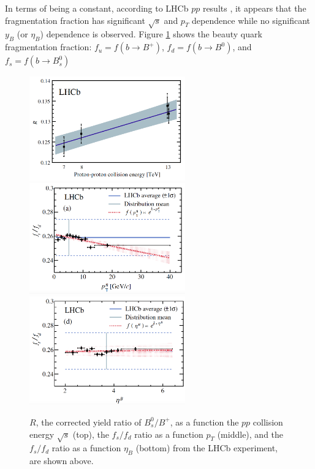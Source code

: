 In terms of being a constant, according to LHCb $pp$ results \cite{LHCbFF}, it appears that the fragmentation fraction has significant $\sqrt s$ and $p_T$ dependence while no significant $y_B$ (or $\eta_B$) dependence is observed. Figure \ref{BeautyFFLHCb} shows the beauty quark fragmentation fraction: $f_u = f(b \rightarrow B^+)$, $f_d = f(b \rightarrow B^0)$, and $f_s = f(b \rightarrow B_s^0)$

 \begin{figure}[hbtp]
\begin{center}
\includegraphics[width=0.60\textwidth]{Figures/Chapter1/LHCbFFs.png}
\includegraphics[width=0.60\textwidth]{Figures/Chapter1/LHCbFFpT.png}
\includegraphics[width=0.60\textwidth]{Figures/Chapter1/LHCbFFy.png}
\caption{$R$, the corrected yield ratio of $B^0_s/B^+$, as a function the $pp$ collision energy $\sqrt s$ (top), the $f_s/f_d$ ratio as a function $p_T$ (middle), and the $f_s/f_d$ ratio as a function $\eta_B$ (bottom) from the LHCb experiment, are shown above.}
\label{BeautyFFLHCb}
\end{center}
\end{figure}   


